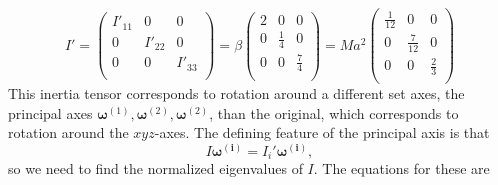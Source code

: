 \documentclass{article}
\begin{document}
        \begin{equation*}
            I' = 
            \begin{pmatrix}
                I'_{11} & 0 & 0 \\
                0 & I'_{22} & 0 \\
                0 & 0 & I'_{33} \\
            \end{pmatrix}
            = \beta
            \begin{pmatrix}
                2 & 0 & 0 \\
                0 & \frac{1}{4} & 0 \\
                0 & 0 & \frac{7}{4} \\
            \end{pmatrix}
            = Ma^2
            \begin{pmatrix}
                \frac{1}{12} & 0 & 0 \\
                0 & \frac{7}{12} & 0  \\
                0 & 0 & \frac{2}{3} \\
            \end{pmatrix}
        \end{equation*}
        This inertia tensor corresponds to rotation around a different set axes, the principal axes $\boldsymbol{\omega}^{(1)}, \boldsymbol{\omega}^{(2)}, \boldsymbol{\omega}^{(2)}$, than the original, which corresponds to rotation around the $xyz$-axes. The defining feature of the principal axis is that
        \begin{equation*}
            I \boldsymbol{\omega^{(i)}} = I_i' \boldsymbol{\omega^{(i)}},
        \end{equation*}
        so we need to find the normalized eigenvalues of $I$. The equations for these are
\end{document}
